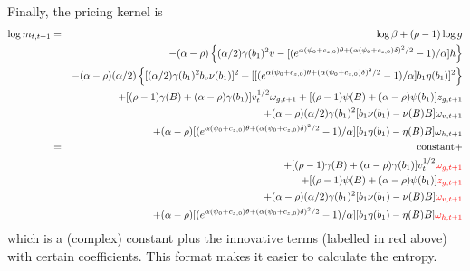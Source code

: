 \documentclass[11pt,reqno,final]{amsart}
\begin{document}
Finally, the pricing kernel is
\begin{eqnarray*}
\log m_{t,t+1} &=& \log \beta + (\rho-1) \log g \\
    & & -(\alpha-\rho)\left\{(\alpha/2)\gamma(b_1)^2 v - [(e^{\alpha(\psi_0+c_{z,0})\theta+(\alpha(\psi_0+c_{z,0})\delta)^2/2}-1)/\alpha] h \right\} \\
    & & -(\alpha-\rho)(\alpha/2)\left\{ [(\alpha/2)\gamma(b_1)^2 b_v\nu(b_1)]^2 + [[(e^{\alpha(\psi_0+c_{z,0})\theta+(\alpha(\psi_0+c_{z,0})\delta)^2/2}-1)/\alpha] b_1\eta(b_1)]^2 \right\} \\
    & & + [(\rho-1)\gamma(B)+(\alpha-\rho)\gamma(b_1)] v_t^{1/2} \omega_{g,t+1} + [(\rho-1)\psi(B)+(\alpha-\rho)\psi(b_1)] z_{g,t+1} \\
    & & + (\alpha-\rho) (\alpha/2)\gamma(b_1)^2 [b_1\nu(b_1)-\nu(B)B]\omega_{v,t+1} \\
    & & + (\alpha-\rho) [(e^{\alpha(\psi_0+c_{z,0})\theta+(\alpha(\psi_0+c_{z,0})\delta)^2/2}-1)/\alpha] [b_1\eta(b_1)-\eta(B)B]\omega_{h,t+1} \\
    &=& \textrm{constant} + \\
    & & + [(\rho-1)\gamma(B)+(\alpha-\rho)\gamma(b_1)] v_t^{1/2} {\color{red} \omega_{g,t+1}} \\
    & & + [(\rho-1)\psi(B)+(\alpha-\rho)\psi(b_1)] {\color{red} z_{g,t+1}} \\
    & & + (\alpha-\rho) (\alpha/2)\gamma(b_1)^2 [b_1\nu(b_1)-\nu(B)B] {\color{red} \omega_{v,t+1}} \\
    & & + (\alpha-\rho) [(e^{\alpha(\psi_0+c_{z,0})\theta+(\alpha(\psi_0+c_{z,0})\delta)^2/2}-1)/\alpha] [b_1\eta(b_1)-\eta(B)B] {\color{red} \omega_{h,t+1}}
\end{eqnarray*}
which is a (complex) constant plus the innovative terms (labelled in red above) with certain coefficients. This format makes it easier to calculate the entropy.
\end{document}
